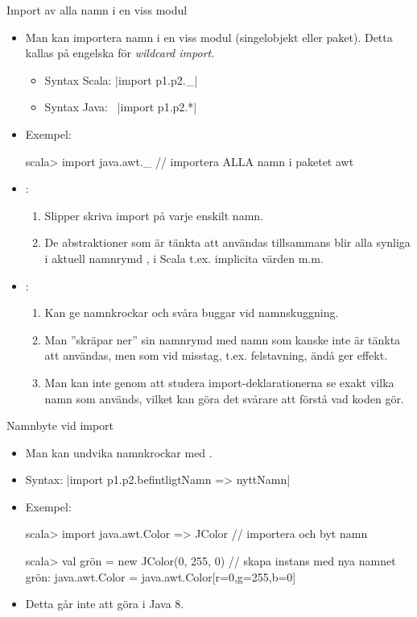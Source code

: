 \begin{Slide}{Import av alla namn i en viss modul}\SlideFontSmall
\begin{itemize}
\item Man kan importera  namn i en viss modul (singelobjekt eller paket). Detta kallas på engelska för \emph{wildcard import}.

\begin{itemize}\SlideFontTiny
  \item Syntax Scala:  \code|import p1.p2._|
  \item Syntax Java:~  \code|import p1.p2.*|
\end{itemize}

\item Exempel:
\begin{REPL}
scala> import java.awt._  // importera ALLA namn i paketet awt
\end{REPL}
\item {}:
\begin{enumerate}\SlideFontTiny
  \item Slipper skriva import på varje enskilt namn.
  \item De abstraktioner som är tänkta att användas tillsammans blir alla synliga i aktuell namnrymd , i Scala t.ex. implicita värden m.m.
\end{enumerate}
\item {}:
\begin{enumerate}\SlideFontTiny
  \item Kan ge namnkrockar och svåra buggar vid namnskuggning.
  \item Man ''skräpar ner'' sin namnrymd med namn som kanske inte är tänkta att användas, men som vid misstag, t.ex. felstavning, ändå ger effekt.
  \item Man kan inte genom att studera import-deklarationerna se exakt vilka namn som används, vilket kan göra det svårare att förstå vad koden gör.
\end{enumerate}
\end{itemize}
\end{Slide}


\begin{Slide}{Namnbyte vid import}
\begin{itemize}
\item Man kan undvika namnkrockar med .
\item Syntax:  \code|import p1.p2.{befintligtNamn => nyttNamn}|
\item Exempel:
\begin{REPL}
scala> import java.awt.{Color => JColor}  // importera och byt namn

scala> val grön = new JColor(0, 255, 0)   // skapa instans med nya namnet
grön: java.awt.Color = java.awt.Color[r=0,g=255,b=0]
\end{REPL}
\item Detta går inte att göra i Java 8.
\end{itemize}
\end{Slide}

